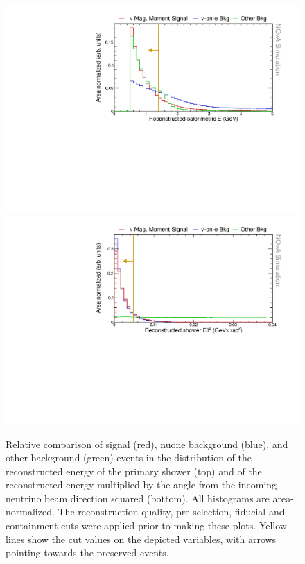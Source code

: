 \begin{figure}[hbtp]
\centering
\includegraphics[width=.9\textwidth]{Plots/NuMMEventSelection/N1Cut_calEHighPre.pdf}
\includegraphics[width=.9\textwidth]{Plots/NuMMEventSelection/N1Cut_eth2Pre.pdf}
\caption[Reconstructed energy and $E\theta^2$ cuts]{Relative comparison of signal (red), \acrshort{nuone} background (blue), and other background (green) events in the distribution of the reconstructed energy of the primary shower (top) and of the reconstructed energy multiplied by the angle from the incoming neutrino beam direction squared (bottom). All histograms are area-normalized. The reconstruction quality, pre-selection, fiducial and containment cuts were applied prior to making these plots. Yellow lines show the cut values on the depicted variables, with arrows pointing towards the preserved events.}
\label{fig:NuMMCutsTMVA2}
\end{figure}


